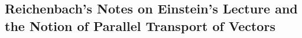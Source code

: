 

\subsection{Reichenbach's Notes on Einstein's Lecture and the Notion of Parallel Transport of Vectors}





